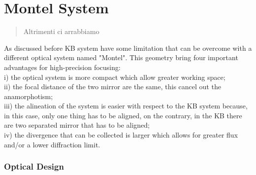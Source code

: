 \chapter{Montel System}
\label{capitolo3}
\thispagestyle{empty}

\begin{quotation}
{\footnotesize
{}
\begin{flushright}
Altrimenti ci arrabbiamo
\end{flushright}
}
\end{quotation}
\vspace{0.5cm}



\hspace{10mm} As discussed before KB system have some limitation that can be overcome with a different optical system named "Montel". This geometry bring four important advantages for high-precision focusing: 
\\ i) the optical system is more compact which allow greater working space;
\\ ii) the focal distance of the two mirror are the same, this cancel out  the anamorphotism;
\\ iii) the alineation of the system is easier with respect to the KB system because, in this case, only one thing has to be aligned, on the contrary, in the KB there are two separated mirror that has to be aligned;
\\ iv) the divergence that can be collected is larger which allows for greater flux and/or a lower diffraction limit.

\subsection{Optical Design}

